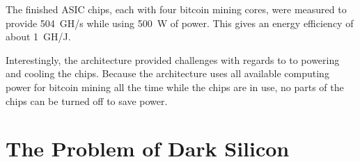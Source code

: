 The finished ASIC chips, each with four bitcoin mining cores, were measured to provide 504~GH/s while using
500~W of power. This gives an energy efficiency of about 1~GH/J.

Interestingly, the architecture provided challenges with regards to to powering and cooling the chips.
Because the architecture uses all available computing power for bitcoin mining all the time while
the chips are in use, no parts of the chips can be turned off to save power. \cite{goldstrike}


%
%
%


\section{The Problem of Dark Silicon}
\label{sec:dark-silicon}

